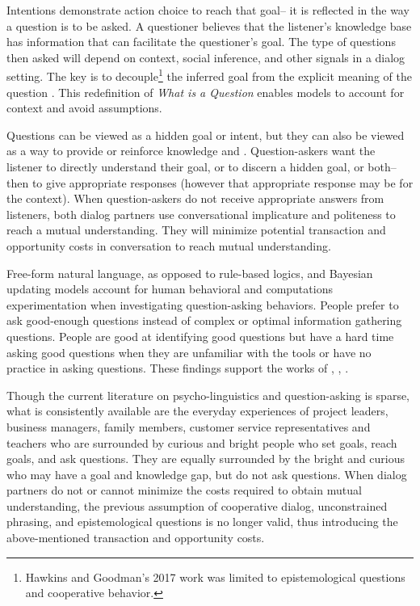 Intentions demonstrate action choice to reach that goal-- it is reflected in the way a question is to be asked. A questioner believes that the listener’s knowledge base has information that can facilitate the questioner’s goal. 
The type of questions then asked will depend on context, social inference, and other signals in a dialog setting. The key is to 
decouple\footnote{Hawkins and Goodman's 2017 work was limited to epistemological questions and cooperative behavior.} the inferred goal from the explicit meaning of the question \citet{hawkins_goodman_2017}. This redefinition of \emph{What is a Question} enables models to account for context and avoid assumptions. 

Questions can be viewed as a hidden goal or intent, but they can also be viewed as a way to provide or reinforce knowledge \citet{alaimi_2020} and \citet{ray_2001}. Question-askers want the listener to directly understand their goal, or to discern a hidden goal, or both-- then to give appropriate responses (however that appropriate response may be for the context). When question-askers do not receive appropriate answers from listeners, both dialog partners use conversational implicature and politeness to reach a mutual understanding. They will minimize potential transaction and opportunity costs in conversation to reach mutual understanding.  

Free-form natural language, as opposed to rule-based logics, and Bayesian updating models account for human behavioral and computations experimentation when investigating question-asking behaviors. People prefer to ask good-enough questions instead of complex or optimal information gathering questions. People are good at identifying good questions but have a hard time asking good questions \citet{rothe_lake_gureckis_2018} when they are unfamiliar with the tools or have no practice in asking questions. These findings support the works of \citet{alaimi_2020}, \citet{hawkins_goodman_2017}, \citet{ray_2001}.

Though the current literature on psycho-linguistics and question-asking is sparse, what is consistently available are the everyday experiences of project leaders, business managers, family members, customer service representatives and teachers who are surrounded by curious and bright people who set goals, reach goals, and ask questions. They are equally surrounded by the bright and curious who may have a goal and knowledge gap, but do not ask questions. When dialog partners do not or cannot minimize the costs required to obtain mutual understanding, the previous assumption of cooperative dialog, unconstrained phrasing, and epistemological questions is no longer valid, thus introducing the above-mentioned transaction and opportunity costs.




